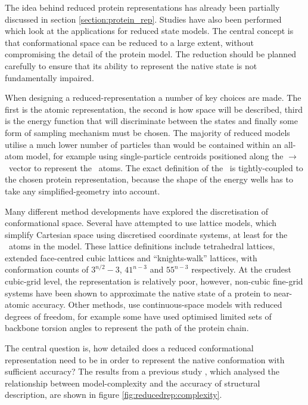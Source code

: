 The idea behind reduced protein representations has already been partially discussed in section \ref{section:protein_rep}. Studies have also been performed which look at the applications for reduced state models\cite{METHOD:Kol2004,METHOD:Sko98}. The central concept is that conformational space can be reduced to a large extent, without compromising the detail of the protein model. The reduction should be planned carefully to ensure that its ability to represent the native state is not  fundamentally impaired.
 
 When designing a reduced-representation a number of key choices are made. The first is the atomic representation, the second is how space will be described, third is the energy function that will discriminate between the states and finally some form of sampling mechanism must be chosen. The majority of reduced models utilise a much lower number of particles than would be contained within an all-atom model, for example using single-particle centroids positioned along the \ca$\to$\cb\ vector to represent the \sidechain\ atoms\cite{COMPCHEM:Gib2001}. The exact definition of the \forcefield\ is tightly-coupled to the chosen protein representation, because the shape of the energy wells has to take any simplified-geometry into account. 

Many different method developments have explored the discretisation of conformational space. Several have attempted to use lattice models, which simplify Cartesian space using discretised coordinate systems, at least for the \mainchain\ atoms in the model.  These lattice definitions include tetrahedral lattices\cite{COMPCHEM:Hin92},  extended face-centred cubic lattices\cite{METHOD:Cov90} and ``knights-walk'' lattices\cite{METHOD:Sko93}, with conformation counts of \mbox{$3^{n/2}-3$}, \mbox{$41^{n-3}$} and \mbox{$55^{n-3}$} respectively. At the crudest cubic-grid level, the representation is relatively poor, however, non-cubic fine-grid systems have been shown to approximate the native state of a protein to near-atomic accuracy\cite{METHOD:Kol2003}. Other methods, use continuous-space models with reduced degrees of freedom, for example some have used optimised limited sets of backbone torsion angles to represent the path of the protein chain\cite{COMPCHEM:Gib2001,COMPCHEM:Rooman91}. 

The central question is, how detailed does a reduced conformational representation need to be in order to represent the native conformation with sufficient accuracy? The results from a previous study \cite{METHOD:ParkLevitt}, which analysed the relationship between model-complexity and the accuracy of structural description, are shown in figure \ref{fig:reducedrep:complexity}. 

